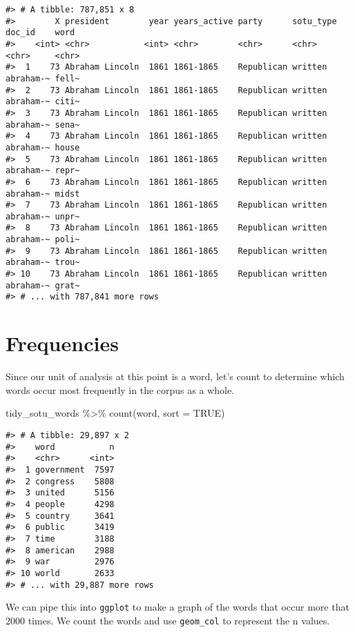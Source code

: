 \documentclass[
]{book}
\newenvironment{Shaded}{\begin{snugshade}}{\end{snugshade}}
\newcommand{\AttributeTok}[1]{\textcolor[rgb]{0.77,0.63,0.00}{#1}}
\newcommand{\ConstantTok}[1]{\textcolor[rgb]{0.00,0.00,0.00}{#1}}
\newcommand{\FunctionTok}[1]{\textcolor[rgb]{0.00,0.00,0.00}{#1}}
\newcommand{\NormalTok}[1]{#1}
\newcommand{\SpecialCharTok}[1]{\textcolor[rgb]{0.00,0.00,0.00}{#1}}
\begin{document}
\begin{verbatim}
#> # A tibble: 787,851 x 8
#>        X president        year years_active party      sotu_type doc_id    word 
#>    <int> <chr>           <int> <chr>        <chr>      <chr>     <chr>     <chr>
#>  1    73 Abraham Lincoln  1861 1861-1865    Republican written   abraham-~ fell~
#>  2    73 Abraham Lincoln  1861 1861-1865    Republican written   abraham-~ citi~
#>  3    73 Abraham Lincoln  1861 1861-1865    Republican written   abraham-~ sena~
#>  4    73 Abraham Lincoln  1861 1861-1865    Republican written   abraham-~ house
#>  5    73 Abraham Lincoln  1861 1861-1865    Republican written   abraham-~ repr~
#>  6    73 Abraham Lincoln  1861 1861-1865    Republican written   abraham-~ midst
#>  7    73 Abraham Lincoln  1861 1861-1865    Republican written   abraham-~ unpr~
#>  8    73 Abraham Lincoln  1861 1861-1865    Republican written   abraham-~ poli~
#>  9    73 Abraham Lincoln  1861 1861-1865    Republican written   abraham-~ trou~
#> 10    73 Abraham Lincoln  1861 1861-1865    Republican written   abraham-~ grat~
#> # ... with 787,841 more rows
\end{verbatim}

\hypertarget{frequencies}{%
\section{Frequencies}\label{frequencies}}

Since our unit of analysis at this point is a word, let's count to determine which words occur most frequently in the corpus as a whole.

\begin{Shaded}
\begin{Highlighting}[]
\NormalTok{tidy\_sotu\_words }\SpecialCharTok{\%\textgreater{}\%}
  \FunctionTok{count}\NormalTok{(word, }\AttributeTok{sort =} \ConstantTok{TRUE}\NormalTok{)}
\end{Highlighting}
\end{Shaded}

\begin{verbatim}
#> # A tibble: 29,897 x 2
#>    word           n
#>    <chr>      <int>
#>  1 government  7597
#>  2 congress    5808
#>  3 united      5156
#>  4 people      4298
#>  5 country     3641
#>  6 public      3419
#>  7 time        3188
#>  8 american    2988
#>  9 war         2976
#> 10 world       2633
#> # ... with 29,887 more rows
\end{verbatim}

We can pipe this into \texttt{ggplot} to make a graph of the words that occur more that 2000 times. We count the words and use \texttt{geom\_col} to represent the n values.
\end{document}
